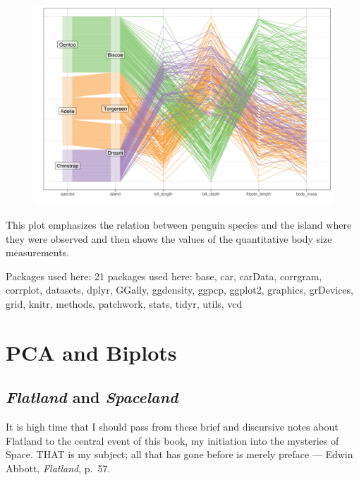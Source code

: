 \documentclass[
  letterpaper,
  10pt,
  krantz2]{krantz}
\renewenvironment{quote}{\begin{VF}}{\end{VF}}
\begin{document}
\begin{figure}

{\centering \includegraphics[width=18in,height=\textheight]{figs/fig-peng-ggpcp2-1.png}

}

\end{figure}

This plot emphasizes the relation between penguin species and the island
where they were observed and then shows the values of the quantitative
body size measurements.

Packages used here: 21 packages used here: base, car, carData, corrgram,
corrplot, datasets, dplyr, GGally, ggdensity, ggpcp, ggplot2, graphics,
grDevices, grid, knitr, methods, patchwork, stats, tidyr, utils, vcd


\hypertarget{sec-pca-biplot}{%
\chapter{PCA and Biplots}\label{sec-pca-biplot}}

\hypertarget{sec-spaceland}{%
\section{\texorpdfstring{\emph{Flatland} and
\emph{Spaceland}}{Flatland and Spaceland}}\label{sec-spaceland}}

\begin{quote}
It is high time that I should pass from these brief and discursive notes
about Flatland to the central event of this book, my initiation into the
mysteries of Space. THAT is my subject; all that has gone before is
merely preface --- Edwin Abbott, \emph{Flatland}, p.~57.
\end{quote}
\end{document}
